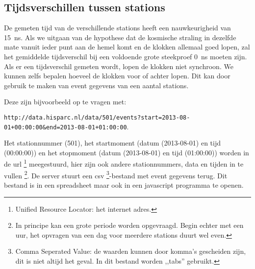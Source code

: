 \subsection{Tijdsverschillen tussen stations}

De gemeten tijd van de verschillende stations heeft een nauwkeurigheid
van \SI{15}{\nano\second}. Als we uitgaan van de hypothese dat de
kosmische straling in dezelfde mate vanuit ieder punt aan de hemel
komt en de klokken allemaal goed lopen, zal het gemiddelde tijdsverschil
bij een voldoende grote steekproef \SI{0}{\nano\second} moeten zijn.
Als er een tijdsverschil gemeten wordt, lopen de klokken niet synchroon.
We kunnen zelfs bepalen hoeveel de klokken voor of achter lopen. Dit
kan door gebruik te maken van event gegevens van een aantal stations. 

Deze zijn bijvoorbeeld op te vragen met:

\texttt{\small{http://data.hisparc.nl/data/501/events?start=2013-08-01+00:00:00\&end=2013-08-01+01:00:00}}. 

Het stationnummer (501), het startmoment (datum (2013-08-01) en tijd
(00:00:00)) en het stopmoment (datum (2013-08-01) en tijd (01:00:00))
worden in de url%
\footnote{Unified Resource Locator: het internet adres.%
} meegestuurd, hier zijn ook andere stationnummers, data en tijden
in te vullen%
\footnote{In principe kan een grote periode worden opgevraagd. Begin echter
met een uur, het opvragen van een dag voor meerdere stations duurt
wel even.%
}. De server stuurt een csv%
\footnote{Comma Seperated Value: de waarden kunnen door komma's gescheiden zijn,
dit is niet altijd het geval. In dit bestand worden ,,tabs'' gebruikt.%
}-bestand met event gegevens terug. Dit bestand is in een spreadsheet
maar ook in een javascript programma te openen. 

